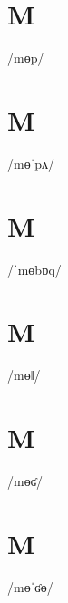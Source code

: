 \documentclass[10pt,a4paper,twoside]{book}
\begin{document}
\section*{M}

\begin{multicols}{3}
 {/mɵp/} {}
\end{multicols}

\section*{M}

\begin{multicols}{3}
 {/mɵˈpʌ/} {}
\end{multicols}

\section*{M}

\begin{multicols}{3}
 {/ˈmɵbɒq/} {}
\end{multicols}

\section*{M}

\begin{multicols}{3}
 {/mɵǁ/} {}
\end{multicols}

\section*{M}

\begin{multicols}{3}
 {/mɵʛ/} {}
\end{multicols}

\section*{M}

\begin{multicols}{3}
 {/mɵˈʛɵ/} {}
\end{multicols}
\end{document}
